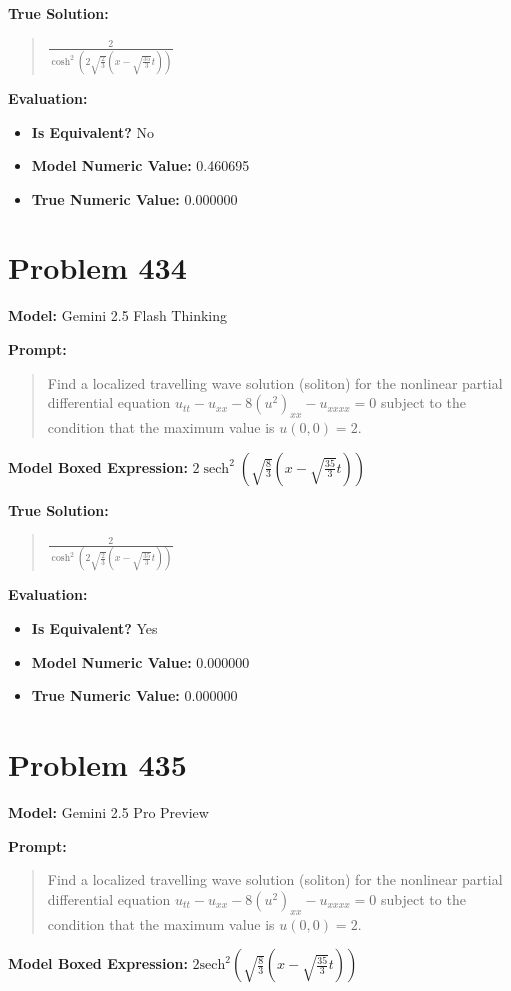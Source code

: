 \documentclass{article}
\begin{document}
\textbf{True Solution:}
\begin{quote}
$\frac{2}{\cosh^2(2\sqrt{\frac{2}{3}}(x-\sqrt{\frac{35}{3}}t))}$
\end{quote}

\textbf{Evaluation:}
\begin{itemize}
\item \textbf{Is Equivalent?} No
\item \textbf{Model Numeric Value:} 0.460695
\item \textbf{True Numeric Value:} 0.000000
\end{itemize}
\vspace{1cm}
\section*{Problem 434}
\textbf{Model:} Gemini 2.5 Flash Thinking

\textbf{Prompt:}
\begin{quote}
Find a localized travelling wave solution (soliton) for the nonlinear partial differential equation $u_{tt} - u_{xx} - 8(u^2)_{xx} - u_{xxxx}=0$ subject to the condition that the maximum value is $u(0,0) = 2$.
\end{quote}
\textbf{Model Boxed Expression:} $2 \operatorname{sech}^{2}\left(\sqrt{\frac{8}{3}}\left(x-\sqrt{\frac{35}{3}} t\right)\right)$

\textbf{True Solution:}
\begin{quote}
$\frac{2}{\cosh^2(2\sqrt{\frac{2}{3}}(x-\sqrt{\frac{35}{3}}t))}$
\end{quote}

\textbf{Evaluation:}
\begin{itemize}
\item \textbf{Is Equivalent?} Yes
\item \textbf{Model Numeric Value:} 0.000000
\item \textbf{True Numeric Value:} 0.000000
\end{itemize}
\vspace{1cm}
\section*{Problem 435}
\textbf{Model:} Gemini 2.5 Pro Preview

\textbf{Prompt:}
\begin{quote}
Find a localized travelling wave solution (soliton) for the nonlinear partial differential equation $u_{tt} - u_{xx} - 8(u^2)_{xx} - u_{xxxx}=0$ subject to the condition that the maximum value is $u(0,0) = 2$.
\end{quote}
\textbf{Model Boxed Expression:} $2 \text{sech}^2\left(\sqrt{\frac{8}{3}}\left(x-\sqrt{\frac{35}{3}}t\right)\right)$
\end{document}
